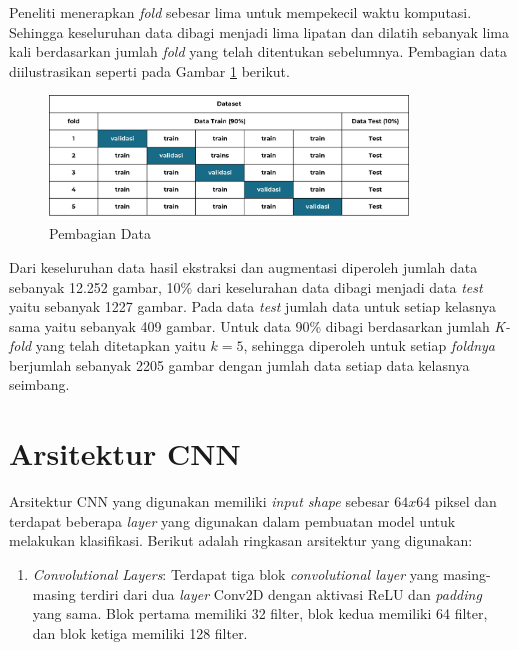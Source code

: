 \begin{table}[H]
    Peneliti menerapkan \textit{fold} sebesar lima untuk mempekecil waktu komputasi. Sehingga keseluruhan data dibagi menjadi lima lipatan dan dilatih sebanyak lima kali berdasarkan jumlah \textit{fold }yang telah ditentukan sebelumnya. Pembagian data diilustrasikan seperti pada Gambar \ref{Pembagian Data} berikut.

         \begin{figure}[H]
               \centering
               \includegraphics[width=0.85\textwidth]{figures/bab4/kfold.png}
               \caption{Pembagian Data}
               \label{Pembagian Data}

         \end{figure}



    Dari keseluruhan data hasil ekstraksi dan augmentasi diperoleh jumlah data sebanyak 12.252 gambar, 10\% dari keselurahan data dibagi menjadi data \textit{test} yaitu sebanyak 1227 gambar. Pada data \textit{test} jumlah data untuk setiap kelasnya sama yaitu sebanyak 409 gambar. Untuk data 90\% dibagi berdasarkan jumlah \textit{K-fold} yang telah ditetapkan yaitu $k = 5$, sehingga diperoleh untuk setiap \textit{foldnya} berjumlah sebanyak 2205 gambar dengan jumlah data setiap data kelasnya seimbang.
    



\section{Arsitektur CNN}

    Arsitektur CNN yang digunakan memiliki \textit{input shape} sebesar $ 64 x 64 $ piksel dan terdapat beberapa \textit{layer} yang digunakan dalam pembuatan model untuk melakukan klasifikasi. Berikut adalah ringkasan arsitektur yang digunakan:

    \begin{enumerate}
        \item     \textit{Convolutional Layers}: Terdapat tiga blok \textit{convolutional layer} yang masing-masing terdiri dari dua \textit{layer} Conv2D dengan aktivasi ReLU dan \textit{padding} yang sama. Blok pertama memiliki 32 filter, blok kedua memiliki 64 filter, dan blok ketiga memiliki 128 filter.
    

\end{enumerate}
\end{table}
